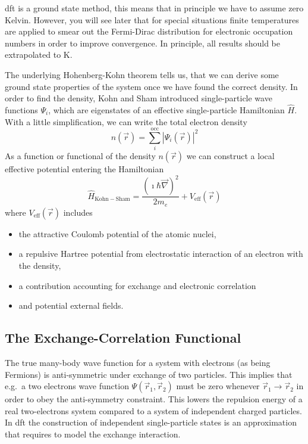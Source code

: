 \documentclass[oribibl]{llncs}
\newcommand{\um}[1]{_{\mathrm{#1}}}
\begin{document}
\ac{dft} is a ground state method, this means that in principle we have to
assume zero Kelvin. However, you will see later that for special situations 
finite temperatures are applied to smear out the Fermi-Dirac distribution 
for electronic occupation numbers in order to improve convergence.
In principle, all results should be extrapolated to \unit[0]{K}.


The underlying Hohenberg-Kohn theorem tells us, that we can derive some 
ground state properties of the system once we have found the correct density.
In order to find the density, Kohn and Sham introduced single-particle wave functions $\Psi_i$, which are eigenstates of an effective single-particle Hamiltonian $\hat H$.
With a little simplification, we can write the total electron density
\begin{equation}
	n(\vec r) = \sum_i^{\mathrm{occ}} \left| \Psi_i(\vec r) \right|^2
	\label{eqn:simplified_density_generation}
\end{equation} 
As a function or functional of the density $n(\vec r)$ we can construct
a local effective potential entering the Hamiltonian
\begin{equation}
	\hat H\um{Kohn-Sham} = \frac{\left( \imath \hbar \vec \nabla \right)^2}{2 m_e} + V\um{eff}(\vec r)
	\label{eqn:Kohn-Sham_Hamiltonian_no_spin}
\end{equation} 
where $V\um{eff}(\vec r)$ includes
\begin{itemize}
  \item the attractive Coulomb potential of the atomic nuclei,
  \item a repulsive Hartree potential from electrostatic 
  		interaction of an electron with the density,
  \item a contribution accounting for exchange and electronic correlation
  \item and potential external fields.
\end{itemize}

\subsection{The Exchange-Correlation Functional}
The true many-body wave function for a system with electrons (as being Fermions)
is anti-symmetric under exchange of two particles. 
This implies that e.g.~a two electrons wave function $\Psi(\vec r_1,\vec r_2)$ must be zero whenever $\vec r_1 \rightarrow \vec r_2$ in order to obey
the anti-symmetry constraint.
This lowers the repulsion energy of a real two-electrons system compared to a
system of independent charged particles.
In \ac{dft} the construction of independent single-particle states is an approximation that requires to model the exchange interaction.
\end{document}
